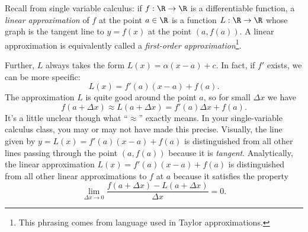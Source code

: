 Recall from single variable calculus: if $f:\R\to\R$ is a differentiable function,
a \emph{linear approximation} of $f$ at the point $a\in\R$ is a function $L:\R\to\R$
whose graph is the tangent line to $y=f(x)$ at the point $(a,f(a))$.  A linear approximation
is equivalently called a \emph{first-order approximation}\footnote{ This phrasing comes from
language used in Taylor approximations.}.

\begin{center}
\end{center}

Further, $L$ always takes the form $L(x)=\alpha(x-a)+c$.  In fact, if $f'$ exists,
we can be more
specific:  \[L(x)=f'(a)(x-a)+f(a).\]
The approximation $L$ is quite good around the point $a$, so for small $\Delta x$ we have
\[
	f(a+\Delta x)\approx L(a+\Delta x) = f'(a)\Delta x+f(a).
\]
It's a little unclear though what ``$\approx$''
exactly means.  In your single-variable calculus class, you may or may not
have made this precise.  Visually, the line given by $y=L(x)=f'(a)(x-a)+f(a)$
is distinguished from all other lines passing through the point $(a,f(a))$ because
it is \emph{tangent}.  Analytically, the linear approximation $L(x)=f'(a)(x-a)+f(a)$
is distinguished from all other linear approximations to $f$ at $a$ because it satisfies
the property
\begin{equation}
	\label{EQONEVARLINAPPROX}
	\lim_{\Delta x\to 0} \frac{f(a+\Delta x)-L(a+\Delta x)}{\Delta x} = 0.
\end{equation}

